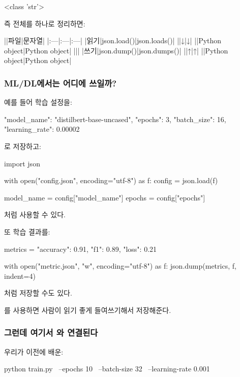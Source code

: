 \begin{dhkzsh}
<class 'str'>
\end{dhkzsh}

즉 전체를 하나로 정리하면:

\begin{dhktable}
||파일|문자열|
|:---|:---|:---|
|읽기|json.load()|json.loads()|
||↓|↓|
||Python object|Python object|
|||
|쓰기|json.dump()|json.dumps()|
||↑|↑|
||Python object|Python object|
\end{dhktable}

\subsubsection{ML/DL에서는 어디에 쓰일까?}

예를 들어 학습 설정을:

\begin{dhkzsh}
{
    "model_name": "distilbert-base-uncased",
    "epochs": 3,
    "batch_size": 16,
    "learning_rate": 0.00002
}
\end{dhkzsh}

로 저장하고:

\begin{dhkcode}
import json

with open("config.json", encoding="utf-8") as f:
    config = json.load(f)

model_name = config["model_name"]
epochs = config["epochs"]
\end{dhkcode}

처럼 사용할 수 있다.

또 학습 결과를:

\begin{dhkcode}
metrics = {
    "accuracy": 0.91,
    "f1": 0.89,
    "loss": 0.21
}

with open("metric.json", "w", encoding="utf-8") as f:
    json.dump(metrics, f, indent=4)
\end{dhkcode}

처럼 저장할 수도 있다.

를 사용하면 사람이 읽기 좋게 들여쓰기해서 저장해준다.

\subsubsection{그런데 여기서 와 연결된다}

우리가 이전에 배운:

\begin{dhkzsh}
python train.py \
    --epochs 10 \
    --batch-size 32 \
    --learning-rate 0.001
\end{dhkzsh}

